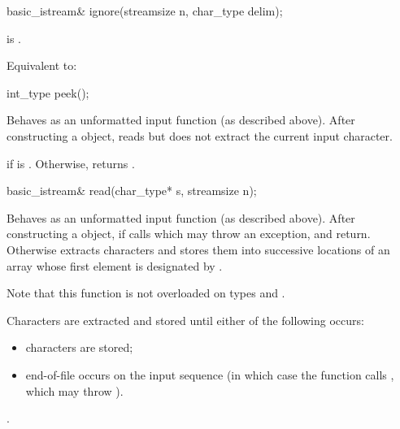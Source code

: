 %
\begin{itemdecl}
basic_istream& ignore(streamsize n, char_type delim);
\end{itemdecl}

\begin{itemdescr}
\pnum
\constraints
{} is .

\pnum
\effects
Equivalent to: 
\end{itemdescr}

%
\begin{itemdecl}
int_type peek();
\end{itemdecl}

\begin{itemdescr}
\pnum
\effects
Behaves as an unformatted input function
(as described above).
After constructing a  object, reads but does not extract
the current input character.

\pnum
\returns
{}
if
is
.
Otherwise, returns
.
\end{itemdescr}

%
\begin{itemdecl}
basic_istream& read(char_type* s, streamsize n);
\end{itemdecl}

\begin{itemdescr}
\pnum
\effects
Behaves as an unformatted input function (as described above).
After constructing
a  object, if
calls
which may throw an exception,
and return.
Otherwise extracts characters and stores them
into successive locations of an array whose first element is designated by
.
\begin{footnote}
Note that this function is not overloaded on types
and
.
\end{footnote}
Characters are extracted and stored until either of the following occurs:
\begin{itemize}
\item
{} characters are stored;
\item
end-of-file occurs on the input sequence
(in which case the function calls
,
which may throw
).
\end{itemize}

\pnum
\returns
{}.
\end{itemdescr}

